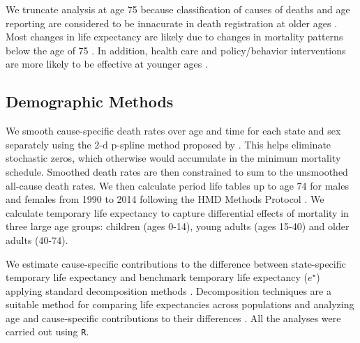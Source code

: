 \documentclass{article}
\begin{document}
\begin{spacing}{1.5}
We truncate analysis at age 75 because classification of causes of deaths and
age reporting are considered to be innacurate in death registration at older
ages \citep{tobias2001}. Most changes in life expectancy are
likely due to changes in mortality patterns below the age of 75 \citep{Aburto2015}. In addition, health care and policy/behavior interventions are more likely to be effective at younger ages \cite{elo2014}.


\subsection*{Demographic Methods}
We smooth cause-specific death rates over age and time for each
state and sex separately using the 2-d p-spline method proposed by
\citet{GC2012}.
This helps eliminate stochastic zeros, which otherwise would accumulate in the
minimum mortality schedule. Smoothed death rates are then constrained to sum to
the unsmoothed all-cause death rates. We then calculate period life tables up to age 74 for males and females from 1990 to 2014 following the HMD Methods
Protocol \citep{HMDMP}. We calculate temporary life expectancy to
capture differential effects of mortality in three large age
groups: children (ages 0-14), young adults (ages 15-40) and older adults
(40-74). %

We estimate cause-specific contributions to the difference between
state-specific temporary life expectancy and benchmark temporary life expectancy
($e^{\star}$) applying standard decomposition methods
\citep{horiuchi2008}. Decomposition techniques are a suitable method for comparing life expectancies across populations and analyzing age and cause-specific contributions to their differences \citep{preston2001}. All the analyses were carried out
using \texttt{R}.


\end{spacing}
\end{document}
